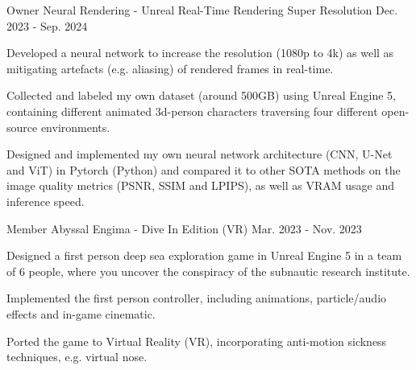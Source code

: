 

\begin{cventries}

  \cventry
    {Owner} %
    {Neural Rendering - Unreal Real-Time Rendering Super Resolution} %
    {\href{https://github.com/BrandnerKasper/URTSR}{\faGithubSquare}} %
    {Dec. 2023 - Sep. 2024} %
    {
      \begin{cvitems} %
        \item {Developed a neural network to increase the resolution (1080p to 4k) as well as mitigating artefacts (e.g. aliasing) of rendered frames in real-time.}
        \item {Collected and labeled my own dataset (around 500GB) using Unreal Engine 5, containing different animated 3d-person characters traversing four different open-source environments.}
        \item {Designed and implemented my own neural network architecture (CNN, U-Net and ViT) in Pytorch (Python) and compared it to other SOTA methods on the image quality metrics (PSNR, SSIM and LPIPS), as well as VRAM usage and inference speed.}
      \end{cvitems}
    }

  \cventry
    {Member} %
    {Abyssal Engima - Dive In Edition (VR)} %
    {\href{https://miggli.itch.io/abyssal-enigma}{\faGamepad}} %
    {Mar. 2023 - Nov. 2023} %
    {
      \begin{cvitems} %
        \item {Designed a first person deep sea exploration game in Unreal Engine 5 in a team of 6 people, where you uncover the conspiracy of the subnautic research institute.}
        \item {Implemented the first person controller, including animations, particle/audio effects and in-game cinematic.}
        \item {Ported the game to Virtual Reality (VR), incorporating anti-motion sickness techniques, e.g. virtual nose.}
      \end{cvitems}
    }


\end{cventries}
